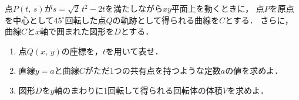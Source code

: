 \documentclass[../../main.tex]{subfiles}
\begin{document}
点$P(t, \, s)$が$s=\sqrt{2} \, t^2-2t$を満たしながら$xy$平面上を動くときに，
点$P$を原点を中心として${45}^\circ$回転した点$Q$の軌跡として得られる曲線を$C$とする．
さらに，曲線$C$と$x$軸で囲まれた図形を$D$とする．
\begin{enumerate}
  \item 点$Q(x, \, y)$の座標を，$t$を用いて表せ．
  \item 直線$y=a$と曲線$C$がただ1つの共有点を持つような定数$a$の値を求めよ．
  \item 図形$D$を$y$軸のまわりに1回転して得られる回転体の体積$V$を求めよ．
\end{enumerate}
\end{document}
